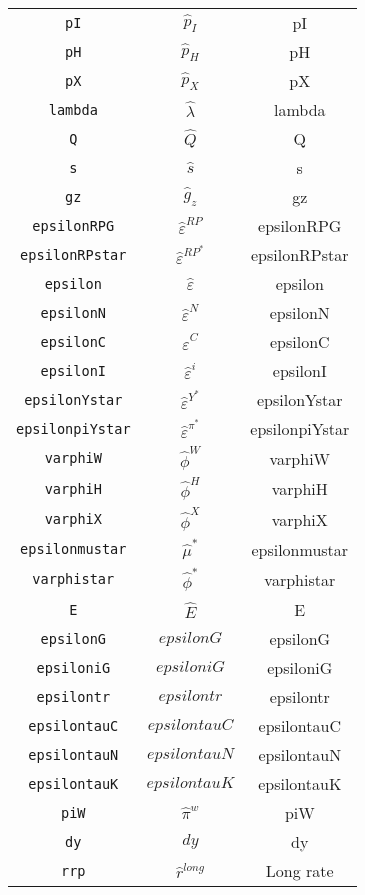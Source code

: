 \begin{center}
\begin{longtable}{ccc}
\texttt{pI} & $\hat{p}_I$ & pI\\
\texttt{pH} & $\hat{p}_H$ & pH\\
\texttt{pX} & $\hat{p}_X$ & pX\\
\texttt{lambda} & $\hat{\lambda}$ & lambda\\
\texttt{Q} & $\hat{Q}$ & Q\\
\texttt{s} & $\hat{s}$ & s\\
\texttt{gz} & ${\hat{g}_z}$ & gz\\
\texttt{epsilonRPG} & $\hat{\varepsilon}^{RP}$ & epsilonRPG\\
\texttt{epsilonRPstar} & $\hat{\varepsilon}^{RP^*}$ & epsilonRPstar\\
\texttt{epsilon} & $\hat{\varepsilon}$ & epsilon\\
\texttt{epsilonN} & $\hat{\varepsilon}^N$ & epsilonN\\
\texttt{epsilonC} & $\hat{\varepsilon}^C$ & epsilonC\\
\texttt{epsilonI} & $\hat{\varepsilon}^i$ & epsilonI\\
\texttt{epsilonYstar} & $\hat{\varepsilon}^{Y^*}$ & epsilonYstar\\
\texttt{epsilonpiYstar} & $\hat{\varepsilon}^{\pi^*}$ & epsilonpiYstar\\
\texttt{varphiW} & $\hat{\phi}^W$ & varphiW\\
\texttt{varphiH} & $\hat{\phi}^H$ & varphiH\\
\texttt{varphiX} & $\hat{\phi}^X$ & varphiX\\
\texttt{epsilonmustar} & $\hat{\mu}^*$ & epsilonmustar\\
\texttt{varphistar} & $\hat{\phi}^*$ & varphistar\\
\texttt{E} & $\hat{E}$ & E\\
\texttt{epsilonG} & $epsilonG$ & epsilonG\\
\texttt{epsiloniG} & $epsiloniG$ & epsiloniG\\
\texttt{epsilontr} & $epsilontr$ & epsilontr\\
\texttt{epsilontauC} & $epsilontauC$ & epsilontauC\\
\texttt{epsilontauN} & $epsilontauN$ & epsilontauN\\
\texttt{epsilontauK} & $epsilontauK$ & epsilontauK\\
\texttt{piW} & $\hat{\pi}^w$ & piW\\
\texttt{dy} & $dy$ & dy\\
\texttt{rrp} & $\hat{r}^{long}$ & Long rate\\

\end{longtable}
\end{center}
